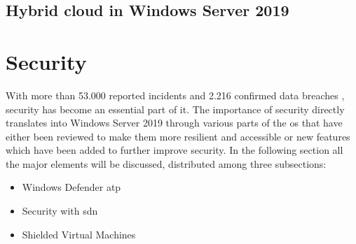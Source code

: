 \subsection{Hybrid cloud in Windows Server 2019}
\clearpage

\section{Security}
With more than 53.000 reported incidents and 2.216 confirmed data breaches \autocite{Verizon2018}, security has become an essential part of \acrshort{it}. The importance of security directly translates into Windows Server 2019 through various parts of the \acrshort{os} that have either been reviewed to make them more resilient and accessible or new features which have been added to further improve security. In the following section all the major elements will be discussed, distributed among three subsections:
\begin{itemize}
	\item Windows Defender \acrfull{atp}
	\item Security with \acrfull{sdn}
	\item Shielded Virtual Machines
\end{itemize}

